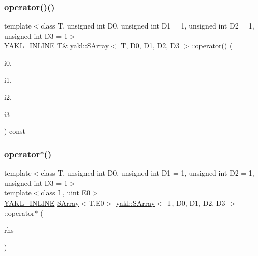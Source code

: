 \mbox{\label{classyakl_1_1SArray_adc1f1d0c5d5674f6a6d0215ac1042219}} 
\subsubsection{\texorpdfstring{operator()()}{operator()()}\hspace{0.1cm}{\footnotesize\ttfamily [4/4]}}
{\footnotesize\ttfamily template$<$class T, unsigned int D0, unsigned int D1 = 1, unsigned int D2 = 1, unsigned int D3 = 1$>$ \\
\hyperlink{YAKL_8h_aa0dd629ffce6d564b19e9313fb91a5ad}{Y\+A\+K\+L\+\_\+\+I\+N\+L\+I\+NE} T\& \hyperlink{classyakl_1_1SArray}{yakl\+::\+S\+Array}$<$ T, D0, D1, D2, D3 $>$\+::operator() (\begin{DoxyParamCaption}\item[{\hyperlink{classyakl_1_1SArray_a777ad93441c16e786309b27e40bc56f0}{uint} const}]{i0,  }\item[{\hyperlink{classyakl_1_1SArray_a777ad93441c16e786309b27e40bc56f0}{uint} const}]{i1,  }\item[{\hyperlink{classyakl_1_1SArray_a777ad93441c16e786309b27e40bc56f0}{uint} const}]{i2,  }\item[{\hyperlink{classyakl_1_1SArray_a777ad93441c16e786309b27e40bc56f0}{uint} const}]{i3 }\end{DoxyParamCaption}) const\hspace{0.3cm}{\ttfamily [inline]}}

\mbox{\label{classyakl_1_1SArray_a5d2efa2ff50772e96b90bee0edccb754}} 
\subsubsection{\texorpdfstring{operator$\ast$()}{operator*()}\hspace{0.1cm}{\footnotesize\ttfamily [1/3]}}
{\footnotesize\ttfamily template$<$class T, unsigned int D0, unsigned int D1 = 1, unsigned int D2 = 1, unsigned int D3 = 1$>$ \\
template$<$class I , uint E0$>$ \\
\hyperlink{YAKL_8h_aa0dd629ffce6d564b19e9313fb91a5ad}{Y\+A\+K\+L\+\_\+\+I\+N\+L\+I\+NE} \hyperlink{classyakl_1_1SArray}{S\+Array}$<$T,E0$>$ \hyperlink{classyakl_1_1SArray}{yakl\+::\+S\+Array}$<$ T, D0, D1, D2, D3 $>$\+::operator$\ast$ (\begin{DoxyParamCaption}\item[{\hyperlink{classyakl_1_1SArray}{S\+Array}$<$ I, D0 $>$ const \&}]{rhs }\end{DoxyParamCaption})\hspace{0.3cm}{\ttfamily [inline]}}

